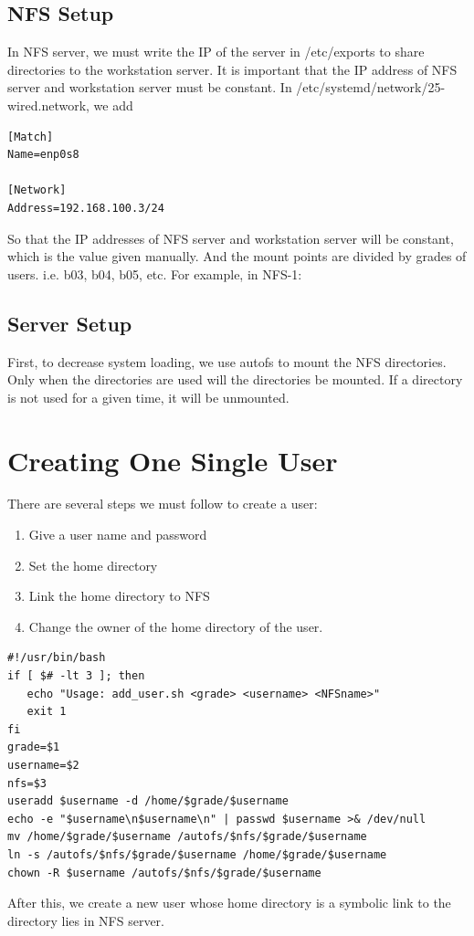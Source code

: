 \documentclass{article}
\begin{document}
\subsection{NFS Setup}
In NFS server, we must write the IP of the server in {\cs /etc/exports} to share directories to the workstation server.
It is important that the IP address of NFS server and workstation server must be constant.
In {\cs /etc/systemd/network/25-wired.network}, we add \\
\begin{verbatim}
[Match]
Name=enp0s8

[Network]
Address=192.168.100.3/24
\end{verbatim}
So that the IP addresses of NFS server and workstation server will be constant, which is the value given manually.
And the mount points are divided by grades of users. i.e. b03, b04, b05, etc. For example, in NFS-1:
\subsection{Server Setup}
First, to decrease system loading, we use {\cs autofs} to mount the NFS directories. Only when the directories are used will the 
directories be mounted. If a directory is not used for a given time, it will be unmounted. 
 \section{Creating One Single User}
There are several steps we must follow to create a user:
   \begin{enumerate}
   \item Give a user name and password
   \item Set the home directory
   \item Link the home directory to NFS
   \item Change the owner of the home directory of the user.
   \end{enumerate}
\begin{framed}
\begin{verbatim}
#!/usr/bin/bash
if [ $# -lt 3 ]; then
   echo "Usage: add_user.sh <grade> <username> <NFSname>"
   exit 1
fi
grade=$1
username=$2
nfs=$3
useradd $username -d /home/$grade/$username
echo -e "$username\n$username\n" | passwd $username >& /dev/null
mv /home/$grade/$username /autofs/$nfs/$grade/$username
ln -s /autofs/$nfs/$grade/$username /home/$grade/$username
chown -R $username /autofs/$nfs/$grade/$username
\end{verbatim}
\end{framed}
After this, we create a new user whose home directory is a symbolic link to the directory lies in NFS server.
\end{document}
